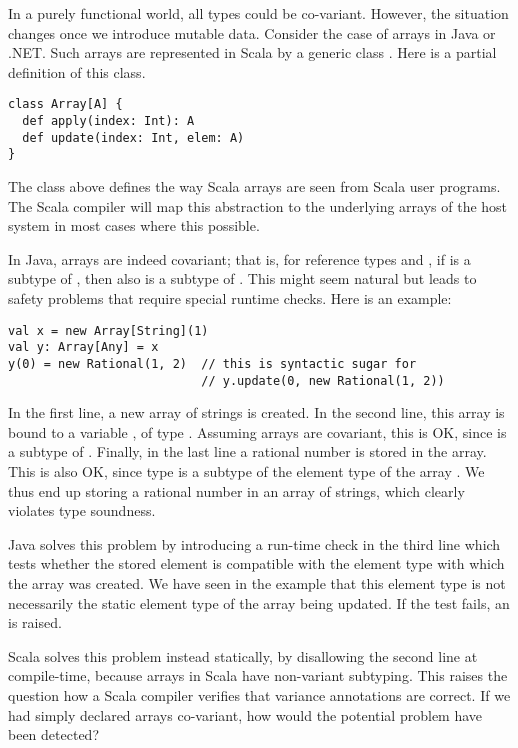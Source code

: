 In a purely functional world, all types could be co-variant. However,
the situation changes once we introduce mutable data. Consider the
case of arrays in Java or .NET. Such arrays are represented in Scala
by a generic class . Here is a partial definition of this
class.
\begin{lstlisting}
class Array[A] {
  def apply(index: Int): A
  def update(index: Int, elem: A)
}
\end{lstlisting}
The class above defines the way Scala arrays are seen from Scala user
programs. The Scala compiler will map this abstraction to the
underlying arrays of the host system in most cases where this
possible.

In Java, arrays are indeed covariant; that is, for reference types
 and , if  is a subtype of , then also
 is a subtype of . This might seem
natural but leads to safety problems that require special runtime
checks. Here is an example:
\begin{lstlisting}
val x = new Array[String](1)
val y: Array[Any] = x
y(0) = new Rational(1, 2)  // this is syntactic sugar for
                           // y.update(0, new Rational(1, 2))
\end{lstlisting}
In the first line, a new array of strings is created. In the second
line, this array is bound to a variable , of type
.  Assuming arrays are covariant, this is OK, since
 is a subtype of . Finally, in
the last line a rational number is stored in the array. This is also
OK, since type  is a subtype of the element type
 of the array . We thus end up storing a rational
number in an array of strings, which clearly violates type soundness. 

Java solves this problem by introducing a run-time check in the third
line which tests whether the stored element is compatible with the
element type with which the array was created. We have seen in the
example that this element type is not necessarily the static element
type of the array being updated. If the test fails, an
 is raised.

Scala solves this problem instead statically, by disallowing the
second line at compile-time, because arrays in Scala have non-variant
subtyping. This raises the question how a Scala compiler verifies that
variance annotations are correct. If we had simply declared arrays
co-variant, how would the potential problem have been detected?

